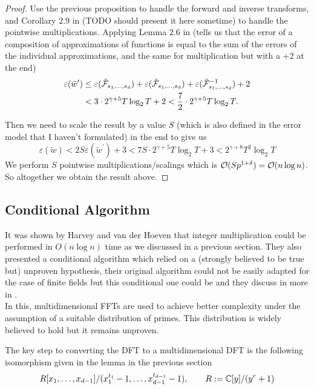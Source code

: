 \begin{proof}
    Use the previous proposition to handle the forward and inverse transforms, and Corollary $2.9$ in \cite{nlogn} (TODO should present it here sometime) to handle the pointwise multiplications. Applying Lemma $2.6$ in \cite{nlogn}(tells us that the error of a composition of approximations of functions is equal to the sum of the errors of the individual approximations, and the same for multiplication but with a +2 at the end)
    \begin{align*}
    \varepsilon(\tilde{w}^\prime) &\leq \varepsilon(\tilde{\mathcal F}_{s_1, \ldots, s_d}) + \varepsilon(\tilde{\mathcal F}_{s_1, \ldots, s_d}) + \varepsilon(\tilde{\mathcal F}^{-1}_{s_1, \ldots, s_d}) + 2\\
                             &< 3 \cdot 2^{\gamma + 5}T\log_2 T + 2 < \frac{7}{2} \cdot 2^{\gamma + 5}T \log_2 T.
    \end{align*}

    Then we need to scale the result by a value $S$ (which is also defined in the error model that I haven't formulated) in the end to give us
    \[
        \varepsilon(\tilde{w}) < 2S\varepsilon(\tilde{w}^\prime) + 3 < 7S \cdot 2^{\gamma + 5} T \log_2 T + 3 < 2^{\gamma + 8}T^2 \log_2 T
    \]
    We perform $S$ pointwise multiplications/scalings which is $\mathcal O(Sp^{1 + \delta}) = \mathcal O(n \log n)$. So altogether we obtain the result above.
\end{proof}


\subsection{Conditional Algorithm}

It was shown by Harvey and van der Hoeven \cite{nlogn} that integer multiplication could be performed in $O(n\log n)$ time as we discussed in a previous section. They also presented a conditional algorithm which relied on a (strongly believed to be true but) unproven hypothesis, their original algorithm could not be easily adapted for the case of finite fields but this conditional one could be and they discuss in more in \cite{ffnlogn}.\\
In this, multidimensional FFTs are used to achieve better complexity under the assumption of a suitable distribution of primes. This distribution is widely believed to hold but it remains unproven.

The key step to converting the DFT to a multidimensional DFT is the following isomorphism given in the lemma in the previous section
\begin{equation}\label{eq:here}
    R[x_1, \ldots, x_{d-1}] / (x_1^{t_1} - 1, \ldots, x_{d-1}^{t_{d-1}} - 1), \qquad R := {\mathbb C}[y]/(y^r + 1)
\end{equation}

